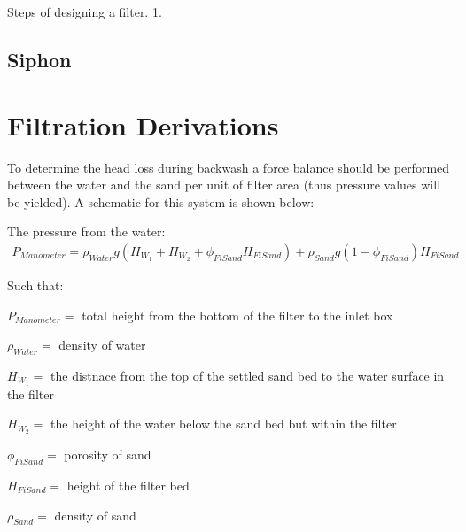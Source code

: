 \documentclass[letterpaper,10pt,english]{sphinxmanual}
\begin{document}
Steps of designing a filter.
1.


\section{Siphon}
\label{\detokenize{Filtration/Filtration_Design:siphon}}\label{\detokenize{Filtration/Filtration_Design:id1}}

\chapter{Filtration Derivations}
\label{\detokenize{Filtration/Filtration_Derivations:filtration-derivations}}\label{\detokenize{Filtration/Filtration_Derivations:title-filtration-derivations}}\label{\detokenize{Filtration/Filtration_Derivations::doc}}\label{\detokenize{Filtration/Filtration_Derivations:derivation-backwash-headloss-force-balance}}
To determine the head loss during backwash a force balance should be performed between the water and the sand per unit of filter area (thus pressure values will be yielded). A schematic for this system is shown below:

\begin{figure}[htbp]
\centering

\noindent{}
\label{\detokenize{Filtration/Filtration_Derivations:figure-force-balance}}\end{figure}

The pressure from the water:
\begin{equation}\label{equation:Filtration/Filtration_Derivations:Filtration/Filtration_Derivations:0}
\begin{split}P_{Manometer} = \rho_{Water} g \left( H_{W_1} + H_{W_2} + \phi_{FiSand} H_{FiSand} \right) + \rho_{Sand} g \left( 1 - \phi_{FiSand} \right) H_{FiSand}\end{split}
\end{equation}
\begin{DUlineblock}{0em}
\item[] Such that:
\item[] \(P_{Manometer} =\) total height from the bottom of the filter to the inlet box
\item[] \(\rho_{Water} =\) density of water
\item[] \(H_{W_1} =\) the distnace from the top of the settled sand bed to the water surface in the filter
\item[] \(H_{W_2} =\) the height of the water below the sand bed but within the filter
\item[] \(\phi_{FiSand} =\) porosity of sand
\item[] \(H_{FiSand} =\) height of the filter bed
\item[] \(\rho_{Sand} =\) density of sand
\end{DUlineblock}
\end{document}
